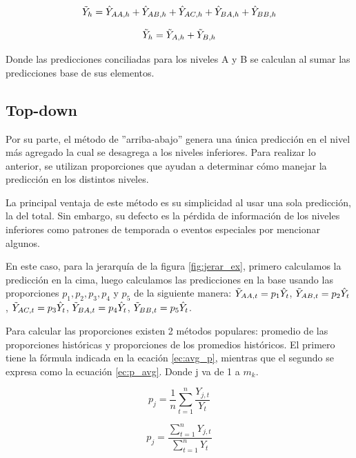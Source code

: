\begin{equation}
    \Tilde{Y}_h = \hat{Y}_{AA,h} + \hat{Y}_{AB,h} + \hat{Y}_{AC,h} + \hat{Y}_{BA,h} + \hat{Y}_{BB,h}
\end{equation}

\begin{equation}
    \Tilde{Y}_h = \Tilde{Y}_{A,h} + \Tilde{Y}_{B,h}
\end{equation}

Donde las predicciones conciliadas para los niveles A y B se calculan al sumar las predicciones base de sus elementos. 


\subsection{Top-down}

Por su parte, el método de ''arriba-abajo'' genera una única predicción en el nivel más agregado la cual se desagrega a los niveles inferiores. Para realizar lo anterior, se utilizan proporciones que ayudan a determinar cómo manejar la predicción en los distintos niveles.

La principal ventaja de este método es su simplicidad al usar una sola predicción, la del total. Sin embargo, su defecto es la pérdida de información de los niveles inferiores como patrones de temporada o eventos especiales por mencionar algunos.

En este caso, para la jerarquía de la figura \ref{fig:jerar_ex}, primero calculamos la predicción en la cima, luego calculamos las predicciones en la base usando las proporciones $p_1, p_2, p_3, p_4$ y $p_5$ de la siguiente manera: $\Tilde{Y}_{AA,t} = p_1\hat{Y}_t$, $\Tilde{Y}_{AB,t} = p_2\hat{Y}_t$, $\Tilde{Y}_{AC,t} = p_3\hat{Y}_t$, $\Tilde{Y}_{BA,t} = p_4\hat{Y}_t$, $\Tilde{Y}_{BB,t} = p_5\hat{Y}_t$. 

Para calcular las proporciones existen 2 métodos populares: promedio de las proporciones históricas y proporciones de los promedios históricos. El primero tiene la fórmula indicada en la ecación \ref{ec:avg_p}, mientras que el segundo se expresa como la ecuación \ref{ec:p_avg}. Donde j va de 1 a $m_k$.

\begin{equation}
    p_j = \frac{1}{n} \sum_{t=1}^{n} \frac{Y_{j,t}}{Y_t}
    \label{ec:avg_p}
\end{equation}

\begin{equation}
    p_j = \frac
            {\sum_{t=1}^{n}Y_{j,t}}
            {\sum_{t=1}^{n}Y_t}
    \label{ec:p_avg}
\end{equation}

